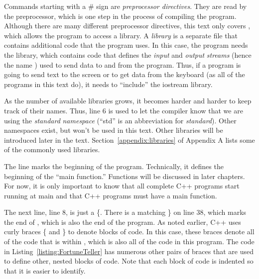 
Commands starting with a \# sign are \emph{preprocessor directives}.  They are read by the preprocessor, which is one step in the process of compiling the program.  Although there are many different preprocessor directives, this text only covers , which allows the program to access a library.  A \emph{library} is a separate file that contains additional code that the program uses.  In this case, the program needs the  library, which contains code that defines the \emph{input} and \emph{output} \emph{streams} (hence the name ) used to send data to and from the program.  Thus, if a program is going to send text to the screen or to get data from the keyboard (as all of the programs in this text do), it needs  to ``include'' the iostream library.


As the number of available libraries grows, it becomes harder and harder to keep track of their names.  Thus, line 6 is used to let the compiler know that we are using the \emph{standard} \emph{namespace} (``std'' is an abbreviation for \emph{standard}).  Other namespaces exist, but won't be used in this text.   Other libraries will be introduced later in the text.  Section~\ref{appendix:libraries} of Appendix A lists some of the commonly used libraries.


The line  marks the beginning of the program.  Technically, it defines the beginning of the ``main function.''  Functions will be discussed in later chapters.  For now, it is only important to know that all complete C++ programs start running at main and that C++ programs must have a main function.  

The next line, line 8, is just a \{.   There is a matching \} on line 38, which marks the end of , which is also the end of the program.  As noted earlier, C++ uses curly braces \{ and \} to denote blocks of code.  In this case, these braces denote all of the code that is within , which is also all of the code in this program.  The code in Listing~\ref{listing:FortuneTeller}  has numerous other pairs of braces that are used to define other, nested blocks of code. Note that each block of code is indented so that it is easier to identify.   

